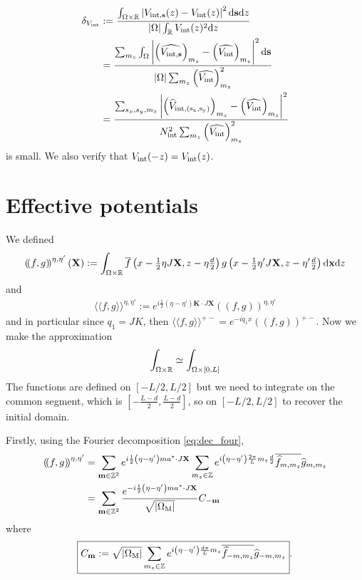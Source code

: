\documentclass[11pt,a4paper,reqno,french,tikz]{amsart}
\def\d{{\rm d}}
\newcommand{\pa}[1]{\left( #1 \right)} %
\newcommand{\seg}[1]{\left[ #1 \right]} %
\newcommand{\ab}[1]{\left|#1\right|} %
\newcommand{\f}[2]{\frac{#1}{#2}} %
\newcommand{\ind}[1]{_{\textup{#1}}} %
\newcommand{\db}[1]{\left(\!\left( #1 \right)\!\right)}
\def\bX{{\mathbf X}}
\def\bx{{\mathbf x}}
\def\bmm{{\mathbf m}}
\def\bs{{\mathbf s}}
\def\bK{{\mathbf K}}
\newcommand{\dd}{\tfrac{d}{2}}
\newcommand{\sqom}{\sqrt{\ab{\Omega\ind{M}}}}
\def\lAngle{\langle\!\langle}
\def\rAngle{\rangle\!\rangle}
\begin{document}
\begin{align*}
	\delta_{V\ind{int}} &:= \f{\int_{\Omega\times \R} \ab{V_{\rm{int},\bs}(z) - V\ind{int}(z)}^2 \d \bs \d z}{\ab{\Omega} \int_{\R} V\ind{int}(z)^2 \d z} \\
&= \f{\sum_{m_z} \int_{\Omega} \ab{\pa{\widehat{V_{\rm{int},\bs}}}_{m_z} - \pa{\widehat{V\ind{int}}}_{m_z}}^2 \d \bs }{\ab{\Omega} \sum_{m_z}  \pa{\widehat{V\ind{int}}}_{m_z}^2} \\
&= \f{\sum_{s_x,s_y,m_z} \ab{\pa{\widehat{V}_{\rm{int},(s_x,s_y)}}_{m_z} - \pa{\widehat{V\ind{int}}}_{m_z}}^2 }{N\ind{int}^2 \sum_{m_z}  \pa{\widehat{V\ind{int}}}_{m_z}^2}
\end{align*}
is small. We also verify that $V\ind{int}(-z) = V\ind{int}(z)$.



\section{Effective potentials}%
\label{sec:effective_potentials}

We defined
\begin{align*}
\db{ f, g}^{\eta,\eta'}(\bX) :=   \int_{\Omega \times \R} \overline{f}\pa{x - \tfrac 12 \eta J\bX,z- \eta\dd} g\pa{x - \tfrac 12 \eta' J \bX, z- \eta'\dd} \d \bx \d z
\end{align*}
and
\begin{align*}
\boxed{\lAngle f, g \rAngle^{\eta,\eta'} := e^{i\f 12 \pa{\eta-\eta'} \bK \cdot J \bX}\db{ f, g}^{\eta,\eta'}}
\end{align*}
and in particular since $q_1 = J K$, then $\lAngle f, g \rAngle^{+-} = e^{-iq_1 x}\db{ f, g}^{+-}$. Now we make the approximation
\begin{align*}
\int_{\Omega\times\R} \simeq  \int_{\Omega\times \seg{0,L}}
\end{align*}
The functions are defined on $[-L/2,L/2]$ but we need to integrate on the common segment, which is $[-\f{L-d}{2},\f{L-d}{2}]$, so on $[-L/2,L/2]$ to recover the initial domain.




Firstly, using the Fourier decomposition \eqref{eq:dec_four},
\begin{align*}
	\db{f,g}^{\eta,\eta'} &=   \sum_{\bmm \in \Z^2} e^{i\f 12 \pa{\eta-\eta'} ma^* \cdot J \bX} \sum_{m_z \in \Z} e^{i\pa{\eta-\eta'} \f{2\pi}{L} m_z \f{d}{2}} \overline{\widehat{f}_{m,m_z}} \widehat{g}_{m,m_z}\\
& = \sum_{\bmm \in \Z^2} \f{e^{-i\f 12 \pa{\eta-\eta'} ma^* \cdot J \bX}}{\sqom} C_{-\bmm}
\end{align*}
where
\begin{align*}
\boxed{C_\bmm := \sqom \sum_{m_z \in \Z} e^{i\pa{\eta-\eta'} \f{d\pi}{L} m_z} \overline{\widehat{f}_{-m,m_z}} \widehat{g}_{-m,m_z}}.
\end{align*}
\end{document}
